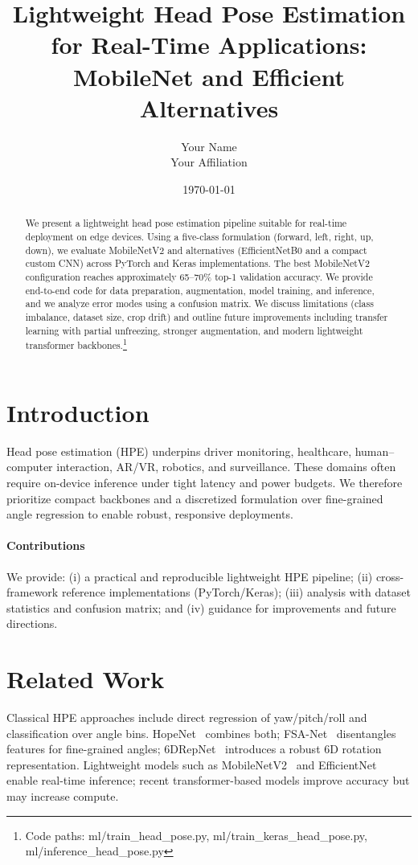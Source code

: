 \documentclass[11pt]{article}
\title{Lightweight Head Pose Estimation for Real-Time Applications: MobileNet and Efficient Alternatives}
\author{Your Name \\ Your Affiliation}
\date{\today}
\begin{document}
\maketitle

\begin{abstract}
We present a lightweight head pose estimation pipeline suitable for real-time deployment on edge devices. Using a five-class formulation (forward, left, right, up, down), we evaluate MobileNetV2 and alternatives (EfficientNetB0 and a compact custom CNN) across PyTorch and Keras implementations. The best MobileNetV2 configuration reaches approximately 65--70\% top-1 validation accuracy. We provide end-to-end code for data preparation, augmentation, model training, and inference, and we analyze error modes using a confusion matrix. We discuss limitations (class imbalance, dataset size, crop drift) and outline future improvements including transfer learning with partial unfreezing, stronger augmentation, and modern lightweight transformer backbones.\footnote{Code paths: ml/train\_head\_pose.py, ml/train\_keras\_head\_pose.py, ml/inference\_head\_pose.py}
\end{abstract}

\section{Introduction}
Head pose estimation (HPE) underpins driver monitoring, healthcare, human--computer interaction, AR/VR, robotics, and surveillance. These domains often require on-device inference under tight latency and power budgets. We therefore prioritize compact backbones and a discretized formulation over fine-grained angle regression to enable robust, responsive deployments.

\paragraph{Contributions} We provide: (i) a practical and reproducible lightweight HPE pipeline; (ii) cross-framework reference implementations (PyTorch/Keras); (iii) analysis with dataset statistics and confusion matrix; and (iv) guidance for improvements and future directions.

\section{Related Work}
Classical HPE approaches include direct regression of yaw/pitch/roll and classification over angle bins. HopeNet~\cite{ruiz2018hopenet} combines both; FSA-Net~\cite{yang2019fsanet} disentangles features for fine-grained angles; 6DRepNet~\cite{hempel20226drepnet} introduces a robust 6D rotation representation. Lightweight models such as MobileNetV2~\cite{sandler2018mobilenetv2} and EfficientNet~\cite{tan2019efficientnet} enable real-time inference; recent transformer-based models improve accuracy but may increase compute.
\end{document}
